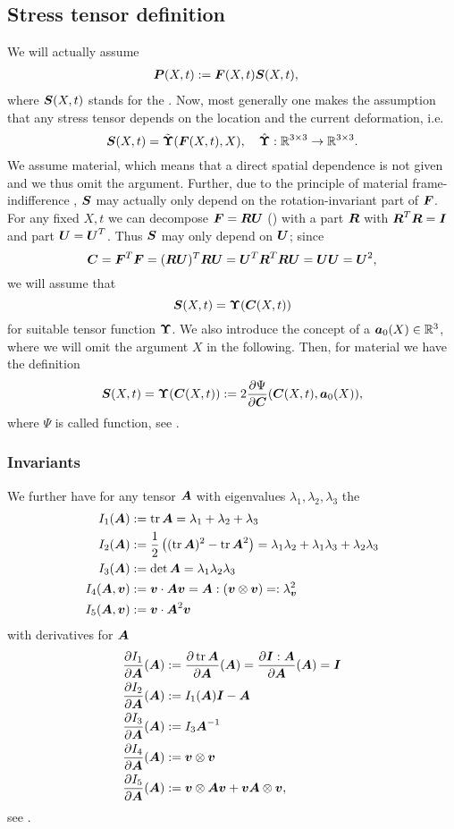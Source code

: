 \subsection{Stress tensor definition}
We will actually assume
\begin{align}
	\vP(X,t) &:= \vF(X,t)\vS(X,t),
\end{align}
where $\vS(X,t)$ stands for the .
Now, most generally one makes the assumption that any stress tensor depends on the location and the current deformation, i.e.
\[
	\vS(X,t) = \tilde{\Sfun}(\vF(X,t),X),\quad \hat{\Sfun}:\R^{3\times 3} \to \R^{3\times 3}.
\]
We assume  material, which means that a direct spatial dependence is not given and we thus omit the argument.
Further, due to the principle of material frame-indifference \cite[p.198]{Holzapfel2000}, $\vS$
may actually only depend on the rotation-invariant part of $\vF$.
For any fixed $X,t$ we can decompose $\vF = \vR\vU$ (\cite[p.85]{Holzapfel2000}) with a
 part $\vR$ with $\vR^T\vR = \vI$ and  part $\vU = \vU^T$.
Thus $\vS$ may only depend on $\vU$; since
\[
	\vC = \vF^T\vF = (\vR\vU)^T\vR\vU = \vU^T\vR^T\vR\vU = \vU\vU = \vU^2, 
\]
we will assume that
\[
	\vS(X,t) = \Sfun(\vC(X,t))
\]
for suitable tensor function $\Sfun$.
We also introduce the concept of a  $\va_0(X) \in\R^3$, where we will omit the argument $X$ in the following.
Then, for  material we have the definition
\[
	\vS(X,t) = \Sfun(\vC(X,t)) := 2\d{\Psi}{\vC}(\vC(X,t),\va_0(X)),
\]
where $\Psi$ is called  function, see \cite[p.207]{Holzapfel2000}.

\subsubsection{Invariants}
We further have for any tensor $\vA$ with eigenvalues $\lambda_1,\lambda_2,\lambda_3$ the 
\begin{align}
	I_1(\vA) &:= \tr\vA = \lambda_1 + \lambda_2 + \lambda_3\label{def:I1}\\
	I_2(\vA) &:= \frac{1}{2}\left((\tr \vA)^2 - \tr\vA^2\right) = \lambda_1\lambda_2 + \lambda_1\lambda_3 + \lambda_2\lambda_3\\
	I_3(\vA) &:= \det\vA = \lambda_1\lambda_2\lambda_3\label{def:I3}\\
	I_4(\vA,\vv) &:= \vv\cdot\vA\vv = \vA : (\vv \otimes \vv)\label{def:I4} =: \lambda^2_{\vv}\\
	I_5(\vA,\vv) &:= \vv\cdot\vA^2\vv\label{def:I5}
\end{align}
with derivatives for  $\vA$
\begin{align}
	\d{I_1}{\vA}(\vA) &:= \d{\tr\vA}{\vA}(\vA) = \d{\vI:\vA}{\vA}(\vA) = \vI\\
	\d{I_2}{\vA}(\vA) &:= I_1(\vA)\vI - \vA\\
	\d{I_3}{\vA}(\vA) &:= I_3\vA^{-1}\\
	\d{I_4}{\vA}(\vA) &:= \vv \otimes \vv\label{def:dI4}\\
	\d{I_5}{\vA}(\vA) &:= \vv \otimes \vA\vv + \vv\vA \otimes \vv,
\end{align}
see \cite[p.216/p.268]{Holzapfel2000}.

